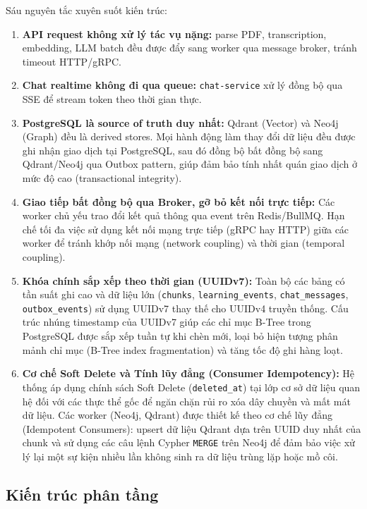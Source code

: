 Sáu nguyên tắc xuyên suốt kiến trúc:

\begin{enumerate}
    \item \textbf{API request không xử lý tác vụ nặng:} parse PDF,
          transcription, embedding, LLM batch đều được đẩy sang worker qua
          message broker, tránh timeout HTTP/gRPC.
    \item \textbf{Chat realtime không đi qua queue:} \texttt{chat-service}
          xử lý đồng bộ qua SSE để stream token theo thời gian thực.
    \item \textbf{PostgreSQL là source of truth duy nhất:} Qdrant (Vector) và
          Neo4j (Graph) đều là derived stores. Mọi hành động làm thay đổi dữ
          liệu đều được ghi nhận giao dịch tại PostgreSQL, sau đó đồng bộ
          bất đồng bộ sang Qdrant/Neo4j qua Outbox pattern, giúp đảm bảo tính
          nhất quán giao dịch ở mức độ cao (transactional integrity).
    \item \textbf{Giao tiếp bất đồng bộ qua Broker, gỡ bỏ kết nối trực tiếp:}
          Các worker chủ yếu trao đổi kết quả thông qua event trên Redis/BullMQ.
          Hạn chế tối đa việc sử dụng kết nối mạng trực tiếp (gRPC hay HTTP) giữa các worker để
          tránh khớp nối mạng (network coupling) và thời gian (temporal coupling).
    \item \textbf{Khóa chính sắp xếp theo thời gian (UUIDv7):} Toàn bộ các bảng có tần suất ghi cao và dữ liệu lớn (\texttt{chunks}, \texttt{learning\_events}, \texttt{chat\_messages}, \texttt{outbox\_events}) sử dụng UUIDv7 thay thế cho UUIDv4 truyền thống. Cấu trúc nhúng timestamp của UUIDv7 giúp các chỉ mục B-Tree trong PostgreSQL được sắp xếp tuần tự khi chèn mới, loại bỏ hiện tượng phân mảnh chỉ mục (B-Tree index fragmentation) và tăng tốc độ ghi hàng loạt.
    \item \textbf{Cơ chế Soft Delete và Tính lũy đẳng (Consumer Idempotency):} Hệ thống áp dụng chính sách Soft Delete (\texttt{deleted\_at}) tại lớp cơ sở dữ liệu quan hệ đối với các thực thể gốc để ngăn chặn rủi ro xóa dây chuyền và mất mát dữ liệu. Các worker (Neo4j, Qdrant) được thiết kế theo cơ chế lũy đẳng (Idempotent Consumers): upsert dữ liệu Qdrant dựa trên UUID duy nhất của chunk và sử dụng các câu lệnh Cypher \texttt{MERGE} trên Neo4j để đảm bảo việc xử lý lại một sự kiện nhiều lần không sinh ra dữ liệu trùng lặp hoặc mồ côi.
\end{enumerate}

\subsection{Kiến trúc phân tầng}


